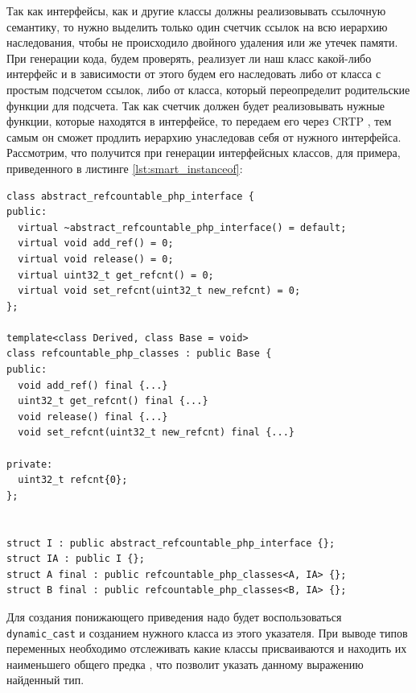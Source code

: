 Так как интерфейсы, как и другие классы должны реализовывать ссылочную семантику, то нужно выделить только один счетчик ссылок на всю иерархию наследования, чтобы не происходило двойного удаления или же утечек памяти.
При генерации кода, будем проверять, реализует ли наш класс какой-либо интерфейс и в зависимости от этого будем его наследовать либо от класса с простым подсчетом ссылок, либо от класса, который переопределит родительские функции для подсчета.
Так как счетчик должен будет реализовывать нужные функции, которые находятся в интерфейсе, то передаем его через CRTP , тем самым он сможет продлить иерархию унаследовав себя от нужного интерфейса.
Рассмотрим, что получится при генерации интерфейсных классов, для примера, приведенного в листинге \ref{lst:smart_instanceof}:
\begin{lstlisting}
class abstract_refcountable_php_interface {
public:
  virtual ~abstract_refcountable_php_interface() = default;
  virtual void add_ref() = 0;
  virtual void release() = 0;
  virtual uint32_t get_refcnt() = 0;
  virtual void set_refcnt(uint32_t new_refcnt) = 0;
};

template<class Derived, class Base = void>
class refcountable_php_classes : public Base {
public:
  void add_ref() final {...}
  uint32_t get_refcnt() final {...}
  void release() final {...}
  void set_refcnt(uint32_t new_refcnt) final {...}

private:
  uint32_t refcnt{0};
};


struct I : public abstract_refcountable_php_interface {};
struct IA : public I {};
struct A final : public refcountable_php_classes<A, IA> {};
struct B final : public refcountable_php_classes<B, IA> {};
\end{lstlisting}

Для создания понижающего приведения надо будет воспользоваться \verb|dynamic_cast| и созданием нужного класса из этого указателя.
При выводе типов переменных необходимо отслеживать какие классы присваиваются и находить их наименьшего общего предка \cite{lca}, что позволит указать данному выражению найденный тип.


